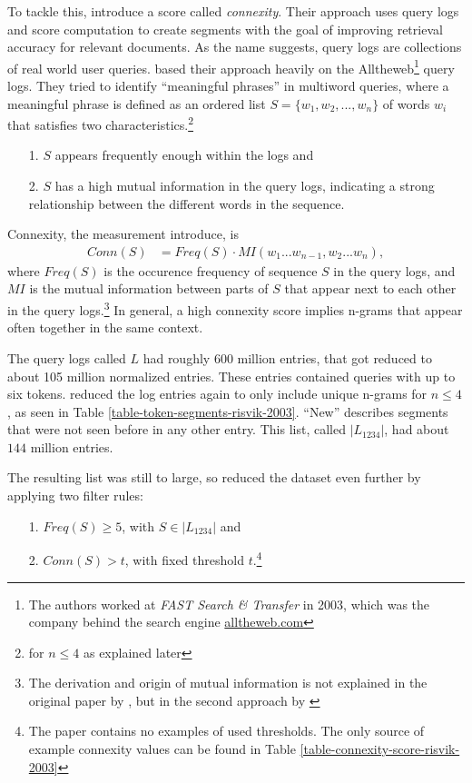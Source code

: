 To tackle this, \citeauthor{Risvik:2003} introduce a score called \textit{connexity}. Their approach uses query logs and score computation to create segments with the goal of improving retrieval accuracy for relevant documents. As the name suggests, query logs are collections of real world user queries. \citeauthor{Risvik:2003} based their approach heavily on the Alltheweb\footnote{The authors worked at \textit{FAST Search \& Transfer} in 2003, which was the company behind the search engine \url{alltheweb.com}} query logs. They tried to identify ``meaningful phrases'' in multiword queries, where a meaningful phrase is defined as an ordered list $S = \{w_1,w_2,...,w_n\}$ of words $w_i$ that satisfies two characteristics.\footnote{for $n \le 4$ as explained later}
\begin{enumerate}
\item[1.] $S$ appears frequently enough within the logs and
\item[2.] $S$ has a high mutual information in the query logs, indicating a strong relationship between the different words in the sequence.
\end{enumerate}

Connexity, the measurement \citeauthor{Risvik:2003} introduce, is
\begin{align*}
Conn(S) &= Freq(S) \cdot MI(w_1...w_{n-1},w_2...w_n),
\end{align*}
where $Freq(S)$ is the occurence frequency of sequence $S$ in the query logs, and $MI$ is the mutual information between parts of $S$ that appear next to each other in the query logs.\footnote{The derivation and origin of mutual information is not explained in the original paper by \citeauthor{Risvik:2003}, but in the second approach by \citeauthor{Bergsma:2007}}
In general, a high connexity score implies n-grams that appear often together in the same context.



The query logs called $L$ had roughly 600 million entries, that got reduced to about 105 million normalized entries. These entries contained queries with up to six tokens. \citeauthor{Risvik:2003} reduced the log entries again to only include unique n-grams for $n \le 4$, as seen in Table \ref{table-token-segments-risvik-2003}.
``New'' describes segments that were not seen before in any other entry.
This list, called $|L_{1234}|$, had about $144$ million entries.

The resulting list was still to large, so \citeauthor{Risvik:2003} reduced the dataset even further by applying two filter rules:
\begin{enumerate}
\item[1.] $Freq(S) \ge 5$, with $S \in |L_{1234}|$ and
\item[2.] $Conn(S) > t$, with fixed threshold $t$.\footnote{The paper contains no examples of used thresholds. The only source of example connexity values can be found in Table \ref{table-connexity-score-risvik-2003}}
\end{enumerate}

